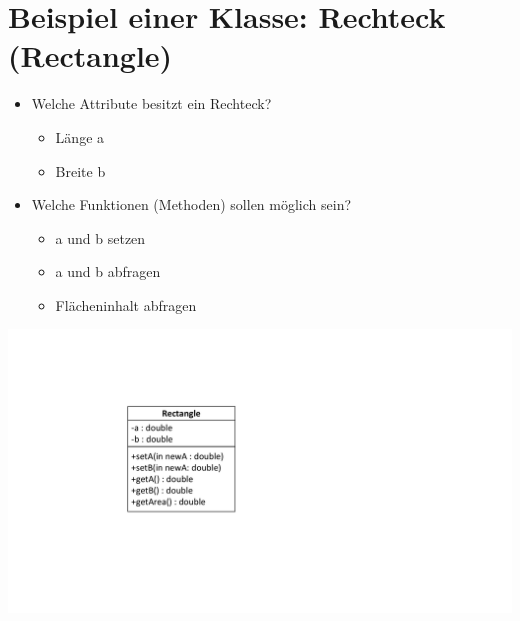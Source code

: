 \section{Beispiel einer Klasse: Rechteck (Rectangle)}
\begin{multicols}{2}
\begin{itemize}
	\item Welche Attribute besitzt ein Rechteck?
	\begin{itemize}
		\item Länge a
		\item Breite b
	\end{itemize}
	\item Welche Funktionen (Methoden) sollen möglich sein?
	\begin{itemize}
		\item a und b setzen
		\item a und b abfragen
		\item Flächeninhalt abfragen
	\end{itemize}
\end{itemize}
\columnbreak
\includegraphics[width=0.5\linewidth]{images/klasse4.pdf}
\end{multicols}

